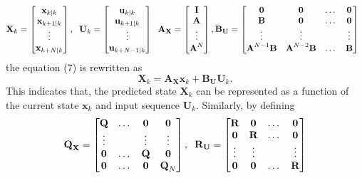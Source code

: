 \documentclass{article}
\begin{document}
 \begin{equation}
\textbf{X}_{k} = \left[\begin{matrix}
\textbf{x}_{k|k}\\\textbf{x}_{k+1|k}\\\vdots\\ \textbf{x}_{k+{N}|k}
\end{matrix}\right], \hspace{.2cm}\textbf{U}_{k} = \left[\begin{matrix}
\textbf{u}_{k|k}\\\textbf{u}_{k+1|k}\\\vdots\\ \textbf{u}_{k+{N}-1|k}
\end{matrix}\right]\hspace{.2cm} \textbf{A}_{\textbf{X}}=    \left[\begin{matrix}
\textbf{I}\\\textbf{A}\\ \vdots \\ \textbf{A}^{{N}} 
\end{matrix}\right], \textbf{B}_{\textbf{U}}=\left[\begin{matrix}
\textbf{0} & \textbf{0}  & \dots &\textbf{0}  \\\textbf{B}& \textbf{0}  & \dots &\textbf{0}\\ \vdots & \vdots& & \vdots\\ \textbf{A}^{{N}-1}\textbf{B} & \textbf{A}^{{N}-2}\textbf{B}  & \dots &\textbf{B}   
\end{matrix}\right] \hspace{.2cm}
\end{equation}
  the equation (7) is rewritten as
\begin{equation}
    \textbf{X}_{k}=\textbf{A}_{\textbf{X}}\textbf{x}_{k}+\textbf{B}_{\textbf{U}}\textbf{U}_{k}.
\end{equation}
This indicates that, the predicted state $\textbf{X}_{k}$ can be represented as a function of the current state $\textbf{x}_{k}$ and   input sequence $\textbf{U}_{k}.$
Similarly, by defining
\begin{equation}
\textbf{Q}_{\textbf{X}} = \left[\begin{matrix}
\textbf{Q} & \dots & \textbf{0} & \textbf{0}\\ \vdots &  &\vdots & \vdots \\ \textbf{0} & \dots & \textbf{Q} & \textbf{0} \\ \textbf{0}& \dots  &\textbf{0} & \textbf{Q}_{N}
\end{matrix}\right], \hspace{.2cm}\textbf{R}_{\textbf{U}} = \left[\begin{matrix}
\textbf{R} &\textbf{0} &\dots  &\textbf{0} \\\textbf{0} & \textbf{R}  & \dots& \textbf{0} \\\vdots & \vdots&  &\vdots \\\textbf{0}& \textbf{0} & \dots & \textbf{R}
\end{matrix}\right]
\end{equation}
\end{document}
